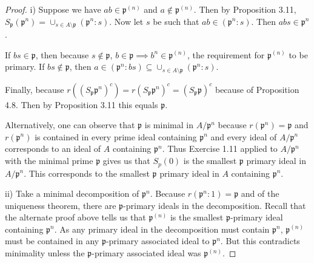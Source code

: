 \begin{proof}
	i) Suppose we have $ab \in \mathfrak{p}^{(n)}  $ and $a\notin \mathfrak{p}^{(n)}  $.
	Then by Proposition 3.11, $S_{\mathfrak{p}}(\mathfrak{p}^n) = \cup_{s \in A \setminus \mathfrak{p}} (\mathfrak{p}^{n} :s) $.
	Now let $s $ be such that $ab \in (\mathfrak{p}^n:s) $.
	Then $ab s \in \mathfrak{p}^n$.

	If $bs \in \mathfrak{p} $, then because $s\notin \mathfrak{p} $, $b \in \mathfrak{p} \implies b^n \in \mathfrak{p}^{(n)}  $, the requirement for $\mathfrak{p}^{(n)}  $ to be primary.
	If $bs \notin \mathfrak{p} $, then $a\in (\mathfrak{p}^n:bs) \subseteq \cup_{s\in A \setminus \mathfrak{p}} (\mathfrak{p}^n: s) $.

	Finally, because $r((S_{\mathfrak{p}}\mathfrak{p}^n)^c) = r(S_{\mathfrak{p}}\mathfrak{p}^n)^c = (S_{\mathfrak{p}}\mathfrak{p})^c $ because of Proposition 4.8.
	Then by Proposition 3.11 this equals $\mathfrak{p} $.

	Alternatively, one can observe that $\mathfrak{p} $ is minimal in $A / \mathfrak{p}^n $	 because $r(\mathfrak{p}^n) = \mathfrak{p} $ and $r(\mathfrak{p}^n)$ is contained in every prime ideal containing $\mathfrak{p}^n $ and every ideal of $A/\mathfrak{p}^n$ corresponds to an ideal of $A $ containing $\mathfrak{p}^n $.
	Thus Exercise 1.11 applied to $A / \mathfrak{p}^n $ with the minimal prime $\mathfrak{p} $ gives us that $S_p(0) $ is the smallest $\mathfrak{p} $ primary ideal in $A / \mathfrak{p}^n $.
	This corresponds to the smallest $\mathfrak{p} $ primary ideal in $A $ containing $\mathfrak{p}^n $.

	ii) 
	Take a minimal decomposition of $\mathfrak{p}^n $.
	Because $r(\mathfrak{p}^n:1) = \mathfrak{p} $ and of the uniqueness theorem, there are $\mathfrak{p} $-primary ideals in the decomposition.
	Recall that the alternate proof above tells us that $\mathfrak{p}^{(n)}$ is the smallest $\mathfrak{p} $-primary ideal containing $\mathfrak{p}^n $.
	As any primary ideal in the decomposition must contain $\mathfrak{p}^n $, $\mathfrak{p}^{(n)}  $ must be contained in any $\mathfrak{p} $-primary associated ideal to $\mathfrak{p}^n $.
	But this contradicts minimality unless the $\mathfrak{p} $-primary associated ideal was $\mathfrak{p}^{(n)}$. 


\end{proof}
